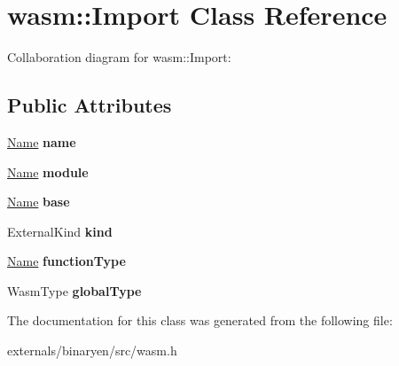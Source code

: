 \hypertarget{classwasm_1_1_import}{}\section{wasm\+:\+:Import Class Reference}
\label{classwasm_1_1_import}


Collaboration diagram for wasm\+:\+:Import\+:
\subsection*{Public Attributes}
\begin{DoxyCompactItemize}
\item 
\mbox{\label{classwasm_1_1_import_a810bf450907ddb42079701373f3f755c}} 
\mbox{\hyperlink{structwasm_1_1_name}{Name}} {\bfseries name}
\item 
\mbox{\label{classwasm_1_1_import_abecf9818f97baee7d186b7231b88e71e}} 
\mbox{\hyperlink{structwasm_1_1_name}{Name}} {\bfseries module}
\item 
\mbox{\label{classwasm_1_1_import_aa2bae2d84bda7822cf2d11ca2fb6948f}} 
\mbox{\hyperlink{structwasm_1_1_name}{Name}} {\bfseries base}
\item 
\mbox{\label{classwasm_1_1_import_aacbe52417adf0e4b88e52017c309e392}} 
External\+Kind {\bfseries kind}
\item 
\mbox{\label{classwasm_1_1_import_a5fc8063c4abb2cbb44284a56a21e99ba}} 
\mbox{\hyperlink{structwasm_1_1_name}{Name}} {\bfseries function\+Type}
\item 
\mbox{\label{classwasm_1_1_import_a0aae50e9038f527fc7587a1110ff30e5}} 
Wasm\+Type {\bfseries global\+Type}
\end{DoxyCompactItemize}


The documentation for this class was generated from the following file\+:\begin{DoxyCompactItemize}
\item 
externals/binaryen/src/wasm.\+h\end{DoxyCompactItemize}
